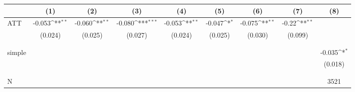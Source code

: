 {
\def\sym#1{\ifmmode^{#1}\else\(^{#1}\)\fi}
\begin{tabular}{l*{8}{c}}
\hline\hline
                    &         (1)         &         (2)         &         (3)         &         (4)         &         (5)         &         (6)         &         (7)         &         (8)         \\
\hline
ATT                 &      -0.053\sym{**} &      -0.060\sym{**} &      -0.080\sym{***}&      -0.053\sym{**} &      -0.047\sym{*}  &      -0.075\sym{**} &       -0.22\sym{**} &                     \\
                    &     (0.024)         &     (0.025)         &     (0.027)         &     (0.024)         &     (0.025)         &     (0.030)         &     (0.099)         &                     \\
                    &                     &                     &                     &                     &                     &                     &                     &                     \\
                    &                     &                     &                     &                     &                     &                     &                     &                     \\
simple              &                     &                     &                     &                     &                     &                     &                     &      -0.035\sym{*}  \\
                    &                     &                     &                     &                     &                     &                     &                     &     (0.018)         \\
                    &                     &                     &                     &                     &                     &                     &                     &                     \\
                    &                     &                     &                     &                     &                     &                     &                     &                     \\
\hline
N                   &                     &                     &                     &                     &                     &                     &                     &        3521         \\
\hline\hline
\end{tabular}
}

